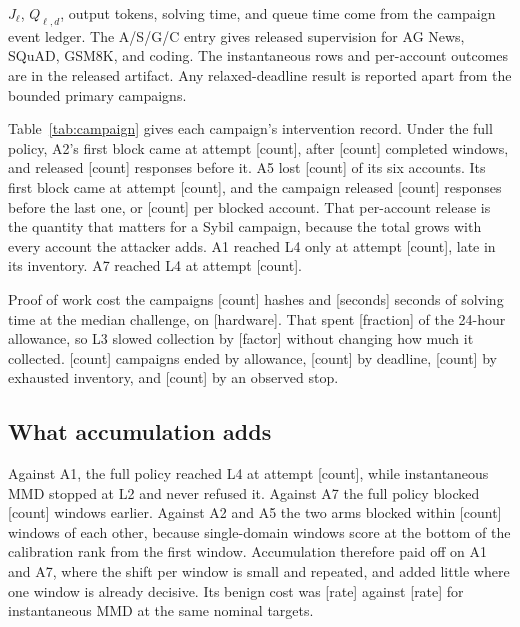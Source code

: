 \documentclass[journal]{IEEEtran}
\newcommand{\tbd}[1]{\textcolor{red!65!black}{[#1]}}
\begin{document}
$J_\ell$, $Q_{\ell,d}$, output tokens, solving time, and queue time come from the campaign event ledger. The A/S/G/C entry gives released supervision for AG News, SQuAD, GSM8K, and coding. The instantaneous rows and per-account outcomes are in the released artifact. Any relaxed-deadline result is reported apart from the bounded primary campaigns.

Table~\ref{tab:campaign} gives each campaign's intervention record. Under the full policy, A2's first block came at attempt \tbd{count}, after \tbd{count} completed windows, and released \tbd{count} responses before it. A5 lost \tbd{count} of its six accounts. Its first block came at attempt \tbd{count}, and the campaign released \tbd{count} responses before the last one, or \tbd{count} per blocked account. That per-account release is the quantity that matters for a Sybil campaign, because the total grows with every account the attacker adds. A1 reached L4 only at attempt \tbd{count}, late in its inventory. A7 reached L4 at attempt \tbd{count}.

Proof of work cost the campaigns \tbd{count} hashes and \tbd{seconds} seconds of solving time at the median challenge, on \tbd{hardware}. That spent \tbd{fraction} of the 24-hour allowance, so L3 slowed collection by \tbd{factor} without changing how much it collected. \tbd{count} campaigns ended by allowance, \tbd{count} by deadline, \tbd{count} by exhausted inventory, and \tbd{count} by an observed stop.

\subsection{What accumulation adds}
Against A1, the full policy reached L4 at attempt \tbd{count}, while instantaneous MMD stopped at L2 and never refused it. Against A7 the full policy blocked \tbd{count} windows earlier. Against A2 and A5 the two arms blocked within \tbd{count} windows of each other, because single-domain windows score at the bottom of the calibration rank from the first window. Accumulation therefore paid off on A1 and A7, where the shift per window is small and repeated, and added little where one window is already decisive. Its benign cost was \tbd{rate} against \tbd{rate} for instantaneous MMD at the same nominal targets.
\end{document}
